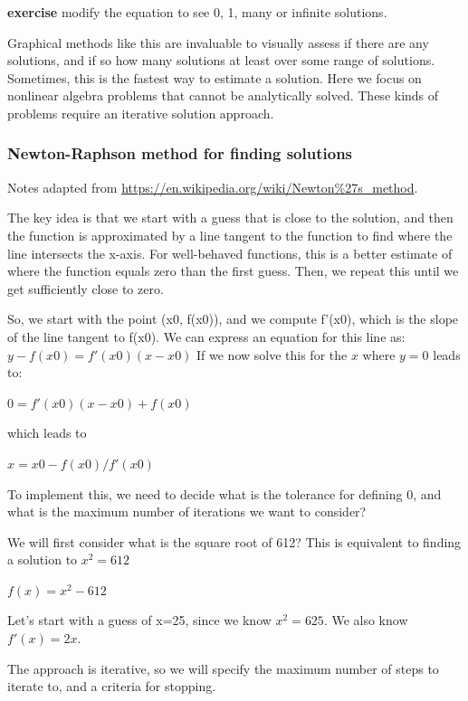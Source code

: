 \documentclass[11pt]{article}
\begin{document}
\textbf{exercise} modify the equation to see 0, 1, many or infinite solutions.

Graphical methods like this are invaluable to visually assess if there are any solutions, and if so how many solutions at least over some range of solutions. Sometimes, this is the fastest way to estimate a solution. Here we focus on nonlinear algebra problems that cannot be analytically solved. These kinds of problems require an iterative solution approach.

\subsubsection{Newton-Raphson method for finding solutions}
\label{sec:orge8a13fa}

Notes adapted from \url{https://en.wikipedia.org/wiki/Newton\%27s\_method}.

The key idea is that we start with a guess that is close to the solution, and then the function is approximated by a line tangent to the function to find where the line intersects the x-axis. For well-behaved functions, this is a better estimate of where the function equals zero than the first guess. Then, we repeat this until we get sufficiently close to zero.

So, we start with the point (x0, f(x0)), and we compute f'(x0), which is the slope of the line tangent to f(x0). We can express an equation for this line as: \(y - f(x0) = f'(x0)(x - x0)\) If we now solve this for the \(x\) where \(y=0\) leads to:

\(0 = f'(x0)(x - x0) + f(x0)\)

which leads to

\(x = x0 - f(x0) / f'(x0)\)

To implement this, we need to decide what is the tolerance for defining 0, and what is the maximum number of iterations we want to consider?

We will first consider what is the square root of 612? This is equivalent to finding a solution to \(x^2 = 612\)

\(f(x) = x^2 - 612\)

Let's start with a guess of x=25, since we know \(x^2=625\). We also know \(f'(x) = 2x\).

The approach is iterative, so we will specify the maximum number of steps to iterate to, and a criteria for stopping.
\end{document}

